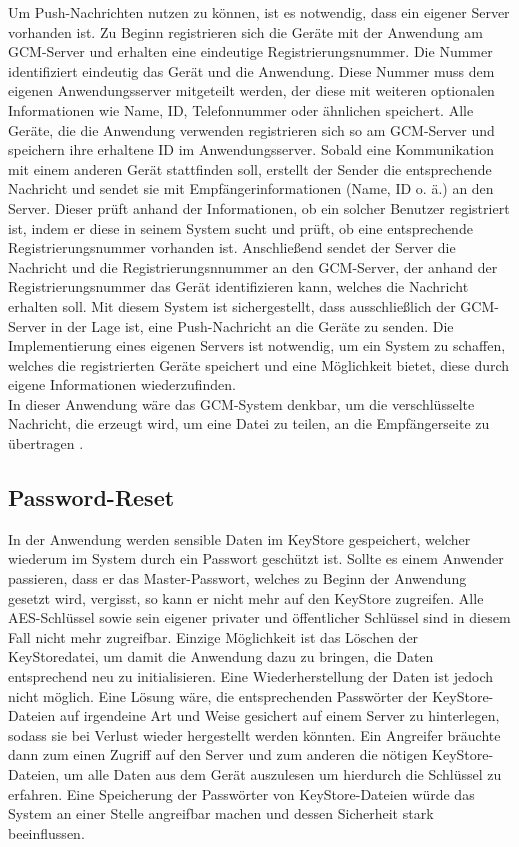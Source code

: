 \documentclass[10pt, a4paper,headsepline,pointednumbers]{scrreprt}
\begin{document}
Um Push-Nachrichten nutzen zu können, ist es notwendig, dass ein eigener Server vorhanden ist. Zu Beginn registrieren sich die Geräte mit der Anwendung am GCM-Server und erhalten eine eindeutige Registrierungsnummer. Die Nummer identifiziert eindeutig das Gerät und die Anwendung. Diese Nummer muss dem eigenen Anwendungsserver mitgeteilt werden, der diese mit weiteren optionalen Informationen wie Name, ID, Telefonnummer oder ähnlichen speichert. Alle Geräte, die die Anwendung verwenden registrieren sich so am GCM-Server und speichern ihre erhaltene ID im Anwendungsserver. Sobald eine Kommunikation mit einem anderen Gerät stattfinden soll, erstellt der Sender die entsprechende Nachricht und sendet sie mit Empfängerinformationen (Name, ID o. ä.) an den Server. Dieser prüft anhand der Informationen, ob ein solcher Benutzer registriert ist, indem er diese in seinem System sucht und prüft, ob eine entsprechende Registrierungsnummer vorhanden ist. Anschließend sendet der Server die Nachricht und die Registrierungsnnummer an den GCM-Server, der anhand der Registrierungsnummer das Gerät identifizieren kann, welches die Nachricht erhalten soll. Mit diesem System ist sichergestellt, dass ausschließlich der GCM-Server in der Lage ist, eine Push-Nachricht an die Geräte zu senden. Die Implementierung eines eigenen Servers ist notwendig, um ein System zu schaffen, welches die registrierten Geräte speichert und eine Möglichkeit bietet, diese durch eigene Informationen wiederzufinden. \\
In dieser Anwendung wäre das GCM-System denkbar, um die verschlüsselte Nachricht, die erzeugt wird, um eine Datei zu teilen, an die Empfängerseite zu übertragen \cite{website:gcm-main}.


\subsection{Password-Reset}
In der Anwendung werden sensible Daten im KeyStore gespeichert, welcher wiederum im System durch ein Passwort geschützt ist. Sollte es einem Anwender passieren, dass er das Master-Passwort, welches zu Beginn der Anwendung gesetzt wird, vergisst, so kann er nicht mehr auf den KeyStore zugreifen. Alle AES-Schlüssel sowie sein eigener privater und öffentlicher Schlüssel sind in diesem Fall nicht mehr zugreifbar. Einzige Möglichkeit ist das Löschen der KeyStoredatei, um damit die Anwendung dazu zu bringen, die Daten entsprechend neu zu initialisieren. Eine Wiederherstellung der Daten ist jedoch nicht möglich. Eine Lösung wäre, die entsprechenden Passwörter der KeyStore-Dateien auf irgendeine Art und Weise gesichert auf einem Server zu hinterlegen, sodass sie bei Verlust wieder hergestellt werden könnten. Ein Angreifer bräuchte dann zum einen Zugriff auf den Server und zum anderen die nötigen KeyStore-Dateien, um alle Daten aus dem Gerät auszulesen um hierdurch die Schlüssel zu erfahren. Eine Speicherung der Passwörter von KeyStore-Dateien würde das System an einer Stelle angreifbar machen und dessen Sicherheit stark beeinflussen.
\end{document}
